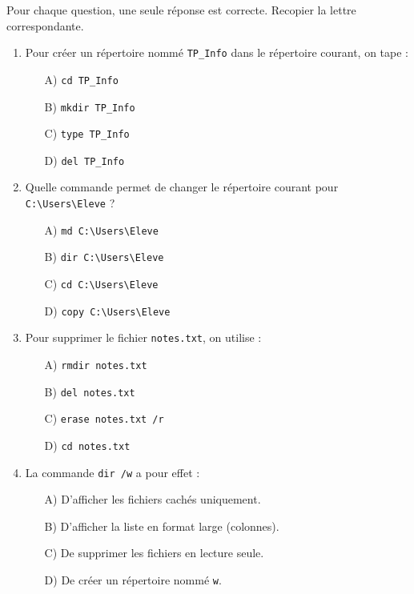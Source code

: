 \documentclass[11pt]{article}
\begin{document}
\begin{exercice}
Pour chaque question, une seule réponse est correcte. Recopier la lettre correspondante.
\begin{enumerate}
    \item Pour créer un répertoire nommé \texttt{TP\_Info} dans le répertoire courant, on tape :
    \begin{itemize}
        \item[A)] \texttt{cd TP\_Info}
        \item[B)] \texttt{mkdir TP\_Info}
        \item[C)] \texttt{type TP\_Info}
        \item[D)] \texttt{del TP\_Info}
    \end{itemize}
    \item Quelle commande permet de changer le répertoire courant pour \texttt{C:\textbackslash Users\textbackslash Eleve} ?
    \begin{itemize}
        \item[A)] \texttt{md C:\textbackslash Users\textbackslash Eleve}
        \item[B)] \texttt{dir C:\textbackslash Users\textbackslash Eleve}
        \item[C)] \texttt{cd C:\textbackslash Users\textbackslash Eleve}
        \item[D)] \texttt{copy C:\textbackslash Users\textbackslash Eleve}
    \end{itemize}
    \item Pour supprimer le fichier \texttt{notes.txt}, on utilise :
    \begin{itemize}
        \item[A)] \texttt{rmdir notes.txt}
        \item[B)] \texttt{del notes.txt}
        \item[C)] \texttt{erase notes.txt /r}
        \item[D)] \texttt{cd notes.txt}
    \end{itemize}
    \item La commande \texttt{dir /w} a pour effet :
    \begin{itemize}
        \item[A)] D'afficher les fichiers cachés uniquement.
        \item[B)] D'afficher la liste en format large (colonnes).
        \item[C)] De supprimer les fichiers en lecture seule.
        \item[D)] De créer un répertoire nommé \texttt{w}.
    \end{itemize}
\end{enumerate}
\end{exercice}
\end{document}

